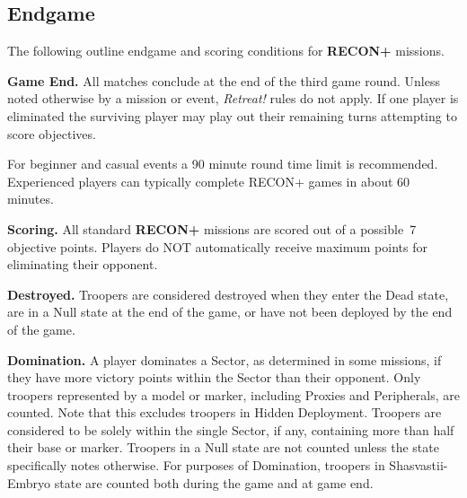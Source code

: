 \documentclass[14pt,dvipsnames]{extarticle}
\newcommand{\missionrule}[1]{\noindent\textbf{#1}\xspace}
\newcommand{\reconplus}{\textbf{RECON+}\xspace}
\begin{document}
\subsection{Endgame}

The following outline endgame and scoring conditions for \reconplus
missions.

\missionrule{Game End.}  All matches conclude at the end of the third
game round.  Unless noted otherwise by a mission or event,
\emph{Retreat!} rules do not apply.  If one player is eliminated the
surviving player may play out their remaining turns attempting to
score objectives.

\begin{recon}
  For beginner and casual events a 90 minute round time limit is
  recommended. Experienced players can typically complete RECON+ games
  in about 60 minutes.
\end{recon}

\missionrule{Scoring.}  All standard \reconplus missions are scored out of a
possible~7 objective points.  Players do NOT automatically receive
maximum points for eliminating their opponent.


\missionrule{Destroyed.} Troopers are considered destroyed when they
enter the Dead state, are in a Null state at the end of the game, or
have not been deployed by the end of the game.


\missionrule{Domination.}  A player dominates a Sector, as determined
in some missions, if they have more victory points within the Sector
than their opponent.  Only troopers represented by a model or marker,
including Proxies and Peripherals, are counted.  Note that this
excludes troopers in Hidden Deployment.  Troopers are considered to be
solely within the single Sector, if any, containing more than half
their base or marker.  Troopers in a Null state are not counted unless
the state specifically notes otherwise.  For purposes of Domination,
troopers in Shasvastii-Embryo state are counted both during the game
and at game end.
\end{document}
